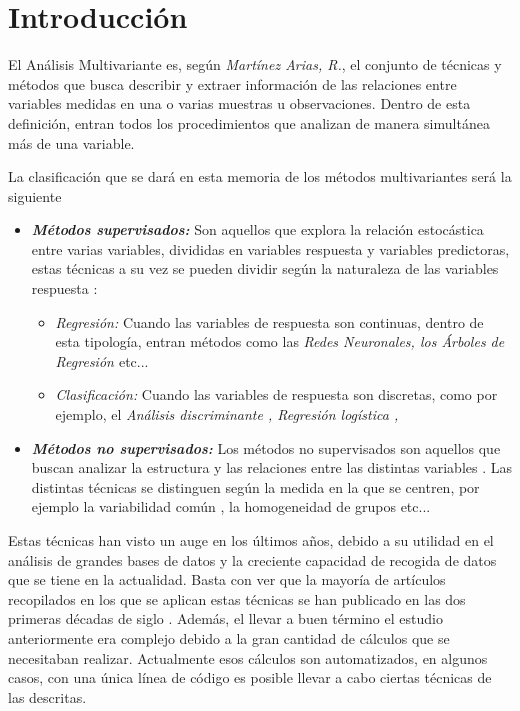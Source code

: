 \chapter*{Introducción}
\noindent El Análisis Multivariante es, según \textit{Martínez Arias, R.}\cite{Rosario 1999}, el conjunto de técnicas y métodos que busca describir y extraer información de las relaciones entre variables medidas en una o varias muestras u observaciones. Dentro de esta definición, entran todos los procedimientos que analizan de manera simultánea más de una variable. 

\noindent La clasificación que se dará en esta memoria de los métodos multivariantes será la siguiente 
\begin{itemize}
\item \textbf{\textit{Métodos supervisados:}} Son aquellos que explora la relación estocástica entre varias variables, divididas en variables respuesta y variables predictoras, estas técnicas a su vez se pueden dividir según la naturaleza de las variables respuesta \cite{James 2013}:
\begin{itemize}
\item \textit{Regresión: } Cuando las variables de respuesta son continuas, dentro de esta tipología, entran métodos como las  \emph{Redes Neuronales\cite{Mamidi 2021}, los Árboles  de Regresión \cite{Nerini 2007} }etc...
\item \textit{Clasificación: }Cuando las variables de respuesta son discretas, como por ejemplo, el \emph{Análisis discriminante \cite{Diez 2002}, Regresión logística \cite{Ensum 2005}, }
\end{itemize}
\item \textbf{\textit{Métodos no supervisados: }} Los métodos no supervisados son aquellos que buscan analizar la estructura y las relaciones entre las distintas variables \cite{Hastie 2001}. Las distintas técnicas se distinguen según la medida en la que se centren, por ejemplo la variabilidad común \cite{Pages 2005}, la homogeneidad de grupos \cite{Okazaki 2006} etc...
\end{itemize}

\noindent Estas técnicas han visto un auge en los últimos años, debido a su utilidad en el análisis de grandes bases de datos y la creciente capacidad de recogida de datos que se tiene en la actualidad. Basta con ver que la mayoría de artículos recopilados en los que se aplican estas técnicas se han publicado en las dos primeras décadas de siglo \cite{Diaz 2006, Galindo 2015,Diez 2002, Echeverri 2015}. Además, el llevar a buen término el estudio anteriormente era complejo debido a la gran cantidad de cálculos que se necesitaban realizar. Actualmente esos cálculos son automatizados, en algunos casos, con una única línea de código es posible llevar a cabo ciertas técnicas de las descritas.

